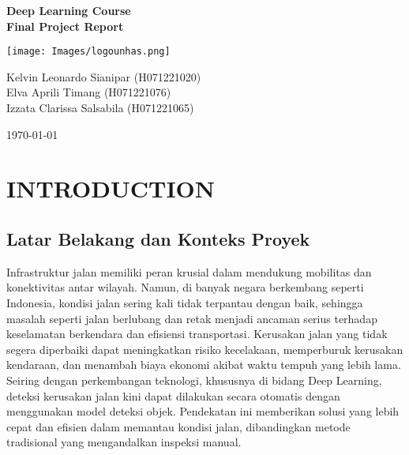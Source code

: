\documentclass[12pt,a4paper]{article}
\begin{document}
\begin{titlepage}
    \centering
    {\Large\textbf{Deep Learning Course \\ Final Project Report}\par} %
    \vspace{2cm} %
    \texttt{[image: Images/logounhas.png]}\par %
    \vspace{2cm} %
    {\large
    Kelvin Leonardo Sianipar (H071221020)\\ 
    Elva Aprili Timang (H071221076)\\ 
    Izzata Clarissa Salsabila (H071221065)\par}
    \vspace{1cm} %
    {\large\today\par} %
\end{titlepage}

\normalsize  %
\tableofcontents
\newpage

\section{INTRODUCTION}
\subsection{Latar Belakang dan Konteks Proyek}
\begin{adjustwidth}{3em}{0pt} 
\hspace{0.5cm} Infrastruktur jalan memiliki peran krusial dalam mendukung mobilitas dan konektivitas antar wilayah. Namun, di banyak negara berkembang seperti Indonesia, kondisi jalan sering kali tidak terpantau dengan baik, sehingga masalah seperti jalan berlubang dan retak menjadi ancaman serius terhadap keselamatan berkendara dan efisiensi transportasi. Kerusakan jalan yang tidak segera diperbaiki dapat meningkatkan risiko kecelakaan, memperburuk kerusakan kendaraan, dan menambah biaya ekonomi akibat waktu tempuh yang lebih lama.
Seiring dengan perkembangan teknologi, khususnya di bidang Deep Learning, deteksi kerusakan jalan kini dapat dilakukan secara otomatis dengan menggunakan model deteksi objek. Pendekatan ini memberikan solusi yang lebih cepat dan efisien dalam memantau kondisi jalan, dibandingkan metode tradisional yang mengandalkan inspeksi manual. \end{adjustwidth}
\
\end{document}
